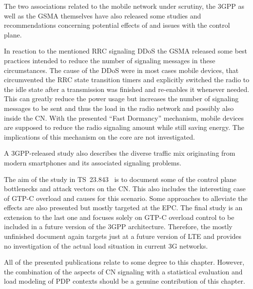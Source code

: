 The two associations related to the mobile network under scrutiny, the \gls{3GPP} as well as the \gls{GSMA} themselves have also released some studies and recommendations concerning potential effects of and issues with the control plane. 

In reaction to the mentioned \gls{RRC} signaling \gls{DDoS} the \gls{GSMA} released some best practices \cite{gsma2011fdbestpract} intended to reduce the number of signaling messages in these circumstances. The cause of the \gls{DDoS} were in most cases mobile devices, that circumvented the \gls{RRC} state transition timers and explicitly switched the radio to the idle state after a transmission was finished and re-enables it whenever needed. This can greatly reduce the power usage but increases the number of signaling messages to be sent and thus the load in the radio network and possibly also inside the \gls{CN}. With the presented ``Fast Dormancy'' mechanism, mobile devices are supposed to reduce the radio signaling amount while still saving energy. The implications of this mechanism on the core are not investigated.

A \gls{3GPP}-released study \cite{3gpp.22.801} also describes the diverse traffic mix originating from modern smartphones and its associated signaling problems.

The aim of the study in \gls{TS}~23.843~\cite{3gpp.23.843} is to document some of the control plane bottlenecks and attack vectors on the \gls{CN}. This also includes the interesting case of \gls{GTP-C} overload and causes for this scenario. Some approaches to alleviate the effects are also presented but mostly targeted at the \gls{EPC}. The final study is an extension to the last one \cite{3gpp.29.807} and focuses solely on \gls{GTP-C} overload control to be included in a future version of the \gls{3GPP} architecture. Therefore, the mostly unfinished document again targets just at a future version of \gls{LTE} and provides no investigation of the actual load situation in current \gls{3G} networks.

All of the presented publications relate to some degree to this chapter. However, the combination of the aspects of \gls{CN} signaling with a statistical evaluation and load modeling of \gls{PDP} contexts should be a genuine contribution of this chapter.



